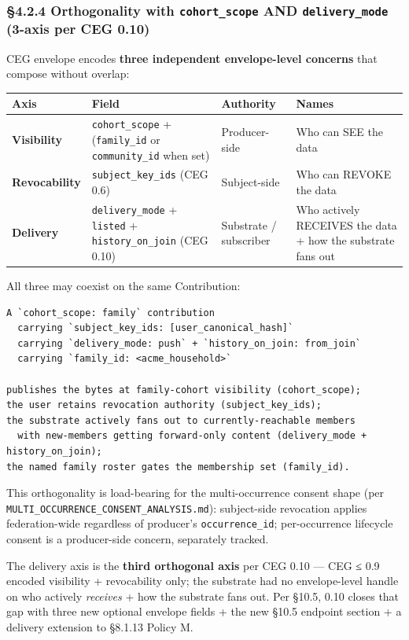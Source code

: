 \documentclass[10pt]{article}
\begin{document}
\subsubsection*{§4.2.4 Orthogonality with \texttt{cohort\_scope} AND \texttt{delivery\_mode} (3-axis per CEG 0.10)}


CEG envelope encodes \textbf{three independent envelope-level concerns} that compose without overlap:


{\scriptsize
\begin{longtable}{|p{4.0cm}|p{4.0cm}|p{4.0cm}|p{4.0cm}|}\hline
\textbf{Axis} & \textbf{Field} & \textbf{Authority} & \textbf{Names} \\ \hline\endhead
\textbf{Visibility} & \texttt{cohort\_scope} + (\texttt{family\_id} or \texttt{community\_id} when set) & Producer-side & Who can SEE the data \\ \hline
\textbf{Revocability} & \texttt{subject\_key\_ids} (CEG 0.6) & Subject-side & Who can REVOKE the data \\ \hline
\textbf{Delivery} & \texttt{delivery\_mode} + \texttt{listed} + \texttt{history\_on\_join} (CEG 0.10) & Substrate / subscriber & Who actively RECEIVES the data + how the substrate fans out \\ \hline
\end{longtable}}


All three may coexist on the same Contribution:


\begin{lstlisting}
A `cohort_scope: family` contribution
  carrying `subject_key_ids: [user_canonical_hash]`
  carrying `delivery_mode: push` + `history_on_join: from_join`
  carrying `family_id: <acme_household>`

publishes the bytes at family-cohort visibility (cohort_scope);
the user retains revocation authority (subject_key_ids);
the substrate actively fans out to currently-reachable members
  with new-members getting forward-only content (delivery_mode + history_on_join);
the named family roster gates the membership set (family_id).
\end{lstlisting}

This orthogonality is load-bearing for the multi-occurrence consent shape (per \texttt{MULTI\_OCCURRENCE\_CONSENT\_ANALYSIS.md}): subject-side revocation applies federation-wide regardless of producer's \texttt{occurrence\_id}; per-occurrence lifecycle consent is a producer-side concern, separately tracked.


The delivery axis is the \textbf{third orthogonal axis} per CEG 0.10 — CEG ≤ 0.9 encoded visibility + revocability only; the substrate had no envelope-level handle on who actively \textit{receives} + how the substrate fans out. Per §10.5, 0.10 closes that gap with three new optional envelope fields + the new §10.5 endpoint section + a delivery extension to §8.1.13 Policy M.
\end{document}
